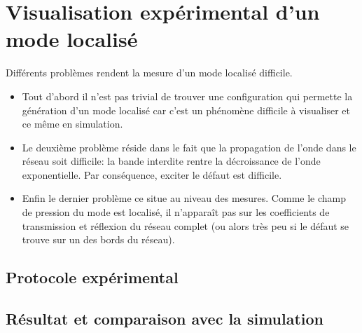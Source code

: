 \chapter{Visualisation expérimental d'un mode localisé}
Différents problèmes rendent la mesure d'un mode localisé difficile.

\begin{itemize}
\item Tout d'abord il n'est pas trivial de trouver une configuration qui permette la génération d'un mode localisé car c'est un phénomène difficile à visualiser et ce même en simulation.

\item Le deuxième problème réside dans le fait que la propagation de l'onde dans le réseau soit difficile: la bande interdite rentre la décroissance de l'onde exponentielle. Par conséquence, exciter le défaut est difficile.

\item Enfin le dernier problème ce situe au niveau des mesures. Comme le champ de pression du mode est localisé, il n’apparaît pas sur les coefficients de transmission et réflexion du réseau complet (ou alors très peu si le défaut se trouve sur un des bords du réseau).
\end{itemize}

\section{Protocole expérimental}
\section{Résultat et comparaison avec la simulation}
